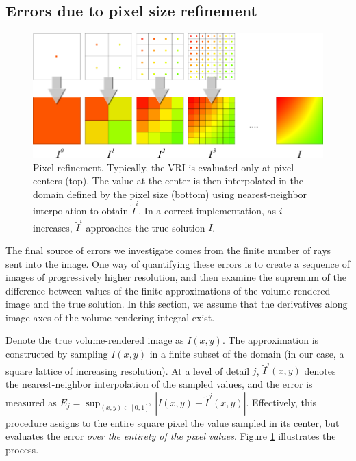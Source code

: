 \subsection{Errors due to pixel size refinement}
\label{sec:VerViaPixelRefinement}

\begin{figure}[t]
\centering
\includegraphics[width=0.95\linewidth]{chapter5/figures/pixel-size-convergence.png}
\caption{\label{fig:pixel_size_refinement} Pixel refinement. Typically, the VRI is evaluated
only at pixel centers (top). The value at the center is then interpolated in the domain defined by the pixel size (bottom) using
nearest-neighbor interpolation to obtain $\tilde{I}^i$. In a correct
implementation, as $i$ increases, $\tilde{I}^i$ approaches the true
solution $I$.}
\end{figure}

The final source of errors we investigate comes from the finite
number of rays sent into the image. One way of quantifying these errors
is to create a sequence of images of progressively higher resolution,
and then examine the supremum of the difference between values of the
finite approximations of the volume-rendered image and the true
solution.  In this section, we assume that the derivatives along image axes of
the volume rendering integral exist.

Denote the true volume-rendered image as $I(x,y)$. The approximation is
constructed by sampling $I(x,y)$ in a finite subset of the domain (in
our case, a square lattice of increasing resolution). At a level of
detail $j$, $\tilde{I}^j(x,y)$ denotes the nearest-neighbor
interpolation of the sampled values, and the error is measured as
$E_j = \sup_{(x,y) \in [0,1]^2} |I(x,y) - \tilde{I}^j(x,y)|$. Effectively, this 
procedure assigns to the entire square pixel the value sampled in its
center, but evaluates the error \emph{over the entirety of the pixel values}.
Figure \ref{fig:pixel_size_refinement} illustrates the
process.

